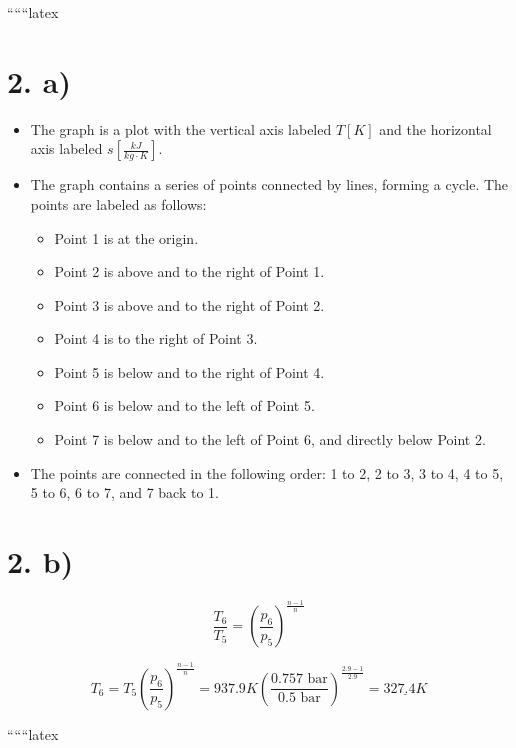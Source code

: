 
``````latex


\section*{2. a)}

\begin{itemize}
    \item The graph is a plot with the vertical axis labeled \( T [K] \) and the horizontal axis labeled \( s \left[ \frac{kJ}{kg \cdot K} \right] \).
    \item The graph contains a series of points connected by lines, forming a cycle. The points are labeled as follows:
    \begin{itemize}
        \item Point 1 is at the origin.
        \item Point 2 is above and to the right of Point 1.
        \item Point 3 is above and to the right of Point 2.
        \item Point 4 is to the right of Point 3.
        \item Point 5 is below and to the right of Point 4.
        \item Point 6 is below and to the left of Point 5.
        \item Point 7 is below and to the left of Point 6, and directly below Point 2.
    \end{itemize}
    \item The points are connected in the following order: 1 to 2, 2 to 3, 3 to 4, 4 to 5, 5 to 6, 6 to 7, and 7 back to 1.
\end{itemize}

\section*{2. b)}

\[
\frac{T_6}{T_5} = \left( \frac{p_6}{p_5} \right)^{\frac{n-1}{n}}
\]

\[
T_6 = T_5 \left( \frac{p_6}{p_5} \right)^{\frac{n-1}{n}} = 937.9K \left( \frac{0.757 \text{ bar}}{0.5 \text{ bar}} \right)^{\frac{2.9-1}{2.9}} = \underline{327.4K}
\]

``````latex


